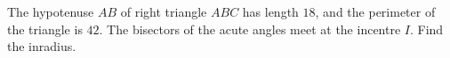 The hypotenuse $AB$ of right triangle $ABC$ has length $18$, and the perimeter of the triangle is $42$. The bisectors of the acute angles meet at the incentre $I$. Find the inradius.
